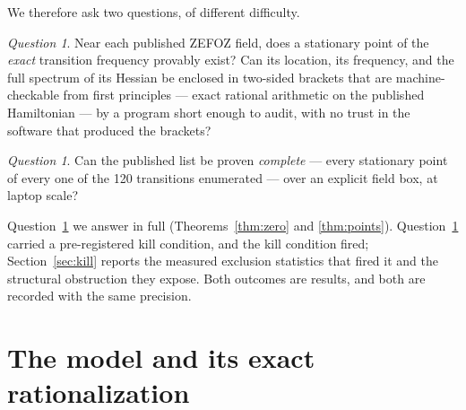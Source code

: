 \documentclass[11pt]{amsart}
\theoremstyle{plain}
\theoremstyle{definition}
\theoremstyle{remark}
\newtheorem{question}[theorem]{Question}
\begin{document}
We therefore ask two questions, of different difficulty.

\begin{question}\label{q:certify}
Near each published ZEFOZ field, does a stationary point of the \emph{exact}
transition frequency provably exist?  Can its location, its frequency, and the
full spectrum of its Hessian be enclosed in two-sided brackets that are
machine-checkable from first principles --- exact rational arithmetic on the
published Hamiltonian --- by a program short enough to audit, with no trust in
the software that produced the brackets?
\end{question}

\begin{question}\label{q:complete}
Can the published list be proven \emph{complete} --- every stationary point of
every one of the 120 transitions enumerated --- over an explicit field box, at
laptop scale?
\end{question}

Question~\ref{q:certify} we answer in full (Theorems~\ref{thm:zero} and
\ref{thm:points}).  Question~\ref{q:complete} carried a pre-registered kill
condition, and the kill condition fired; Section~\ref{sec:kill} reports the
measured exclusion statistics that fired it and the structural obstruction they
expose.  Both outcomes are results, and both are recorded with the same
precision.

\section{The model and its exact rationalization}\label{sec:model}
\end{document}
